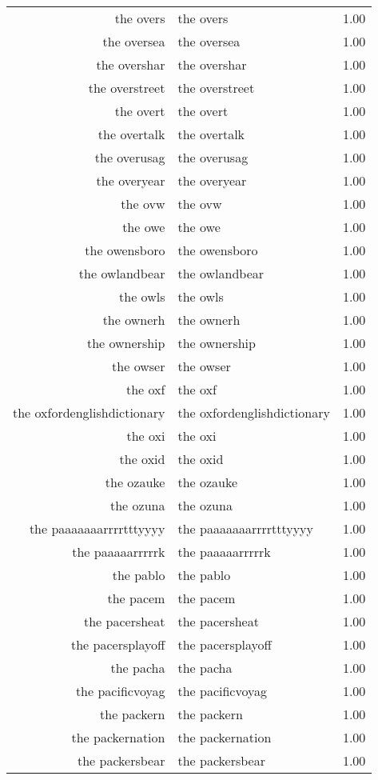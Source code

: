 \begin{table}[ht]
\begin{tabular}{rlr}
  the overs & the overs & 1.00 \\ 
  the oversea & the oversea & 1.00 \\ 
  the overshar & the overshar & 1.00 \\ 
  the overstreet & the overstreet & 1.00 \\ 
  the overt & the overt & 1.00 \\ 
  the overtalk & the overtalk & 1.00 \\ 
  the overusag & the overusag & 1.00 \\ 
  the overyear & the overyear & 1.00 \\ 
  the ovw & the ovw & 1.00 \\ 
  the owe & the owe & 1.00 \\ 
  the owensboro & the owensboro & 1.00 \\ 
  the owlandbear & the owlandbear & 1.00 \\ 
  the owls & the owls & 1.00 \\ 
  the ownerh & the ownerh & 1.00 \\ 
  the ownership & the ownership & 1.00 \\ 
  the owser & the owser & 1.00 \\ 
  the oxf & the oxf & 1.00 \\ 
  the oxfordenglishdictionary & the oxfordenglishdictionary & 1.00 \\ 
  the oxi & the oxi & 1.00 \\ 
  the oxid & the oxid & 1.00 \\ 
  the ozauke & the ozauke & 1.00 \\ 
  the ozuna & the ozuna & 1.00 \\ 
  the paaaaaaarrrrtttyyyy & the paaaaaaarrrrtttyyyy & 1.00 \\ 
  the paaaaarrrrrk & the paaaaarrrrrk & 1.00 \\ 
  the pablo & the pablo & 1.00 \\ 
  the pacem & the pacem & 1.00 \\ 
  the pacersheat & the pacersheat & 1.00 \\ 
  the pacersplayoff & the pacersplayoff & 1.00 \\ 
  the pacha & the pacha & 1.00 \\ 
  the pacificvoyag & the pacificvoyag & 1.00 \\ 
  the packern & the packern & 1.00 \\ 
  the packernation & the packernation & 1.00 \\ 
  the packersbear & the packersbear & 1.00 \\ 

\end{tabular}
\end{table}
